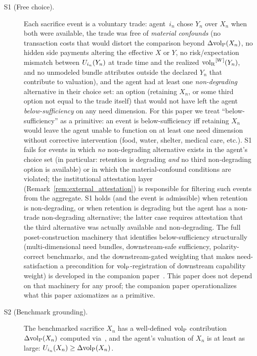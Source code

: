 \begin{description}
\item[S1 (Free choice).] Each sacrifice event is a voluntary
  trade: agent~$i_n$ chose $Y_n$ over $X_n$ when both were
  available, the trade was free of \emph{material confounds}
  (no transaction costs that would distort the comparison
  beyond $\Delta{\operatorname{vol}_{\mathrm{P}}}(X_n)$, no hidden side payments altering
  the effective $X$ or $Y$, no risk/expectation mismatch
  between $U_{i_{n}}(Y_n)$ at trade time and the realized
  ${\operatorname{vol}_{\mathrm{R}}}^{[W]}(Y_n)$, and no unmodeled bundle attributes
  outside the declared $Y_n$ that contribute to valuation),
  and the agent had at least one \emph{non-degrading}
  alternative in their choice set: an option (retaining $X_n$,
  or some third option not equal to the trade itself) that
  would not have left the agent \emph{below-sufficiency} on
  any need dimension.  For this paper we treat
  ``below-sufficiency'' as a primitive: an event is
  below-sufficiency iff retaining $X_n$ would leave
  the agent unable to function on at least one need dimension
  without corrective intervention (food, water, shelter,
  medical care, etc.).  S1 fails for events in which
  \emph{no} non-degrading alternative exists in the agent's
  choice set (in particular: retention is degrading
  \emph{and} no third non-degrading option is available) or in
  which the material-confound conditions are violated; the
  institutional attestation layer
  (Remark~\ref{rem:external_attestation}) is responsible for
  filtering such events from the aggregate.  S1 holds (and the
  event is admissible) when retention is non-degrading, or when
  retention is degrading but the agent has a non-trade
  non-degrading alternative; the latter case requires
  attestation that the third alternative was actually available
  and non-degrading.  The full
  poset-construction machinery that identifies below-sufficiency
  structurally (multi-dimensional need bundles, downstream-safe
  sufficiency, polarity-correct benchmarks, and the
  downstream-gated weighting that makes need-satisfaction a
  precondition for ${\operatorname{vol}_{\mathrm{P}}}$-registration of downstream capability
  weight) is developed in the companion
  paper~\citep[Need~Sufficiency]{lasser2026paper8b}.
  This paper does not depend on that machinery for any proof;
  the companion paper operationalizes what this paper
  axiomatizes as a primitive.

\item[S2 (Benchmark grounding).] The benchmarked sacrifice $X_n$
  has a well-defined ${\operatorname{vol}_{\mathrm{P}}}$ contribution $\Delta{\operatorname{vol}_{\mathrm{P}}}(X_n)$
  computed via~\citep[Proposition~1]{lasser2026poset}, and the
  agent's valuation of $X_n$ is at least as large:
  $U_{i_{n}}(X_n) \geq \Delta{\operatorname{vol}_{\mathrm{P}}}(X_n)$.


\end{description}
